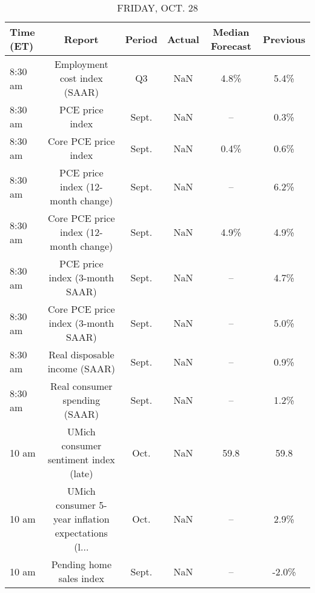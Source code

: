 \documentclass{article}%
\begin{document}
\begin{table}[htbp]%
\caption{FRIDAY, OCT. 28}%
\centering%
\begin{adjustbox}{width=1\textwidth}%
\begin{tabular}{lccccc}
\toprule
Time (ET) &                                             Report & Period & Actual & Median Forecast & Previous \\
\midrule
  8:30 am &                       Employment cost index (SAAR) &     Q3 &    NaN &            4.8\% &     5.4\% \\
  8:30 am &                                    PCE price index &  Sept. &    NaN &              -- &     0.3\% \\
  8:30 am &                               Core PCE price index &  Sept. &    NaN &            0.4\% &     0.6\% \\
  8:30 am &                  PCE price index (12-month change) &  Sept. &    NaN &              -- &     6.2\% \\
  8:30 am &             Core PCE price index (12-month change) &  Sept. &    NaN &            4.9\% &     4.9\% \\
  8:30 am &                     PCE price index (3-month SAAR) &  Sept. &    NaN &              -- &     4.7\% \\
  8:30 am &                Core PCE price index (3-month SAAR) &  Sept. &    NaN &              -- &     5.0\% \\
  8:30 am &                      Real disposable income (SAAR) &  Sept. &    NaN &              -- &     0.9\% \\
  8:30 am &                      Real consumer spending (SAAR) &  Sept. &    NaN &              -- &     1.2\% \\
    10 am &              UMich consumer sentiment index (late) &   Oct. &    NaN &            59.8 &     59.8 \\
    10 am & UMich consumer 5-year inflation expectations (l... &   Oct. &    NaN &              -- &     2.9\% \\
    10 am &                           Pending home sales index &  Sept. &    NaN &              -- &    -2.0\% \\
\bottomrule
\end{tabular}
%
\end{adjustbox}%
\end{table}

%
\end{document}
